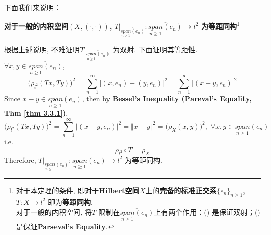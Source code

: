\begin{thm}
\begin{rmk}
\begin{itemize}
				\vspace{3em}
				
				下面我们来说明：
				\begin{center}
					\textbf{对于一般的内积空间$(X , (\cdot , \cdot))$, $T \Big|_{\overline{\underset{n \geq 1}{span} (e_n)}} : \overline{\underset{n \geq 1}{span} (e_n)} \longrightarrow l^2$ 为等距同构}\footnote{对于本定理的条件, 即对于\textbf{Hilbert空间$X$}上的\textbf{完备的标准正交系$\{ e_n \}_{n \geq 1}$}, $T : X \longrightarrow l^2$ 即为\textbf{等距同构}. \\
						对于一般的内积空间, 将$T$ 限制在$\overline{\underset{n \geq 1}{span} (e_n)}$上有两个作用：() 是保证双射；() 是保证\textbf{Parseval's Equality}.}
				\end{center}
				
				\vspace{3em}
				
				根据上述说明, 不难证明$T \Big|_{\overline{\underset{n \geq 1}{span} (e_n)}}$ 为双射. 下面证明其等距性. \\
				$\forall x , y \in \overline{\underset{n \geq 1}{span} (e_n)}$, 
				\[ \Big( \rho_{l^2}(Tx , Ty) \Big)^2 
				= \sum_{n = 1}^{\infty} \Big| (x , e_n) - (y , e_n) \Big|^2 
				= \sum_{n = 1}^{\infty} \Big| (x - y , e_n) \Big|^2 \]
				Since $x - y \in \overline{\underset{n \geq 1}{span} (e_n)}$, then by \textbf{Bessel's Inequality (Pareval's Equality, Thm \ref{thm 3.3.1})}, 
				\[ \Big( \rho_{l^2}(Tx , Ty) \Big)^2 
				= \sum_{n = 1}^{\infty} \Big| (x - y , e_n) \Big|^2 
				= \Vert x - y \Vert^2 
				= \Big( \rho_{X}(x , y) \Big)^2 , \,\, \forall x , y \in \overline{\underset{n \geq 1}{span} (e_n)} \]
				i.e.
				\[ \rho_{l^2} \circ T = \rho_{X} \]
				Therefore, $T \Big|_{\overline{\underset{n \geq 1}{span} (e_n)}} : \overline{\underset{n \geq 1}{span} (e_n)} \longrightarrow l^2$ 为等距同构. 
			\end{itemize}
		\end{rmk}
		
		\newpage
		

\end{thm}
